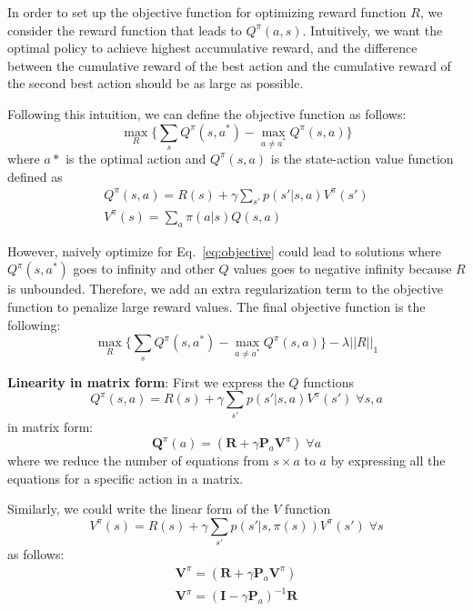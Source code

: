 \documentclass[11pt]{article}
\begin{document}
In order to set up the objective function for optimizing reward function $R$, we consider the reward function that leads to $Q^\pi(a,s)$. Intuitively, we want the optimal policy to achieve highest accumulative reward, and the difference between the cumulative reward of the best action and the cumulative reward of the second best action should be as large as possible. 

Following this intuition, we can define the objective function as follows:
\begin{equation}\label{eq:objective}
    \max_R\{\sum_s Q^\pi(s,a^*)-\max_{a\neq a^*}Q^\pi(s,a)\}
\end{equation}
where $a*$ is the optimal action and $Q^\pi(s,a)$ is the state-action value function defined as
\begin{align}
    Q^\pi(s,a) = R(s)+\gamma\sum_{s'}p(s'|s,a)V^\pi(s')\\
    V^\pi(s) = \sum_a\pi(a|s)Q(s,a)
\end{align}

However, naively optimize for Eq.~\ref{eq:objective} could lead to solutions where $Q^\pi(s,a^*)$ goes to infinity and other $Q$ values goes to negative infinity because $R$ is unbounded. Therefore, we add an extra regularization term to the objective function to penalize large reward values. The final objective function is the following:
\begin{equation}\label{eq:objective_final}
    \max_R\{\sum_s Q^\pi(s,a^*)-\max_{a\neq a^*}Q^\pi(s,a)\} - \lambda||R||_1
\end{equation}

\textbf{Linearity in matrix form}:
First we express the $Q$ functions 
\begin{equation}
    Q^\pi(s,a) = R(s)+\gamma\sum_{s'}p(s'|s,a)V^\pi(s') \;\forall s,a 
\end{equation}
in matrix form:
\begin{equation}
    \mathbf{Q}^\pi(a)=(\mathbf{R}+\gamma\mathbf{P}_a\mathbf{V}^\pi) \;\forall a 
\end{equation}
where we reduce the number of equations from $s\times a$ to $a$ by expressing all the equations for a specific action in a matrix.

Similarly, we could write the linear form of the $V$ function
\begin{equation}
    V^\pi(s) = R(s)+\gamma\sum_{s'}p(s'|s,\pi(s))V^\pi(s') \;\forall s
\end{equation}
as follows:
\begin{align}
    \mathbf{V}^\pi=(\mathbf{R}+\gamma\mathbf{P}_a\mathbf{V}^\pi)\\
    \mathbf{V}^\pi=(\mathbf{I}-\gamma\mathbf{P}_a)^{-1}\mathbf{R}
\end{align}
\end{document}
